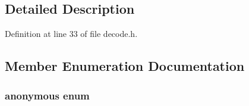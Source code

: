 \subsection{Detailed Description}


Definition at line 33 of file decode.\+h.



\subsection{Member Enumeration Documentation}
\subsubsection[{\texorpdfstring{anonymous enum}{anonymous enum}}]{\setlength{\rightskip}{0pt plus 5cm}anonymous enum}\hypertarget{structreplaygain__synthesis__spec__t_a2bfc2695f3013622d17969ebc31a993a}{}\label{structreplaygain__synthesis__spec__t_a2bfc2695f3013622d17969ebc31a993a}
